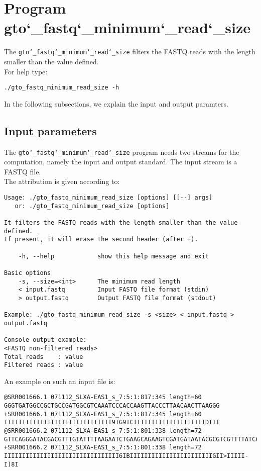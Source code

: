 \section{Program gto\char`_fastq\char`_minimum\char`_read\char`_size}
The \texttt{gto\char`_fastq\char`_minimum\char`_read\char`_size} filters the FASTQ reads with the length smaller than the value defined.\\
For help type:
\begin{lstlisting}
./gto_fastq_minimum_read_size -h
\end{lstlisting}
In the following subsections, we explain the input and output paramters.

\subsection*{Input parameters}

The \texttt{gto\char`_fastq\char`_minimum\char`_read\char`_size} program needs two streams for the computation,
namely the input and output standard. The input stream is a FASTQ file.\\
The attribution is given according to:
\begin{lstlisting}
Usage: ./gto_fastq_minimum_read_size [options] [[--] args]
   or: ./gto_fastq_minimum_read_size [options]

It filters the FASTQ reads with the length smaller than the value defined. 
If present, it will erase the second header (after +).

    -h, --help            show this help message and exit

Basic options
    -s, --size=<int>      The minimum read length
    < input.fastq         Input FASTQ file format (stdin)
    > output.fastq        Output FASTQ file format (stdout)

Example: ./gto_fastq_minimum_read_size -s <size> < input.fastq > output.fastq

Console output example:
<FASTQ non-filtered reads>
Total reads    : value
Filtered reads : value
\end{lstlisting}
An example on such an input file is:
\begin{lstlisting}
@SRR001666.1 071112_SLXA-EAS1_s_7:5:1:817:345 length=60
GGGTGATGGCCGCTGCCGATGGCGTCAAATCCCACCAAGTTACCCTTAACAACTTAAGGG
+SRR001666.1 071112_SLXA-EAS1_s_7:5:1:817:345 length=60
IIIIIIIIIIIIIIIIIIIIIIIIIIIIII9IG9ICIIIIIIIIIIIIIIIIIIIIDIII
@SRR001666.2 071112_SLXA-EAS1_s_7:5:1:801:338 length=72
GTTCAGGGATACGACGTTTGTATTTTAAGAATCTGAAGCAGAAGTCGATGATAATACGCGTCGTTTTATCAT
+SRR001666.2 071112_SLXA-EAS1_s_7:5:1:801:338 length=72
IIIIIIIIIIIIIIIIIIIIIIIIIIIIIIII6IBIIIIIIIIIIIIIIIIIIIIIIIGII>IIIII-I)8I
\end{lstlisting}

